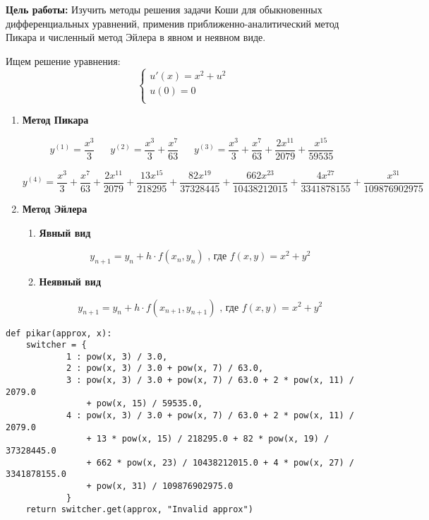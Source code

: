 \documentclass[a4paper,14pt]{article} %
\begin{document}
\textbf{Цель работы: } Изучить методы решения задачи Коши для обыкновенных дифференциальных уравнений, применив приближенно-аналитический метод Пикара и численный метод Эйлера в явном и неявном виде. 

Ищем решение уравнения:
$$
\left\{
  \begin{array}{ccc}
     u'(x)=x^2+u^2 \\
     u(0)=0 \\
  \end{array}
\right.
$$

\begin{enumerate}
\item \textbf{Метод Пикара}

$$y^{(1)}=\frac{x^3}{3}
~~~~~~~y^{(2)}=\frac{x^3}{3} + \frac{x^7}{63}
~~~~~~~y^{(3)}=\frac{x^3}{3}+ \frac{x^7}{63} + \frac{2x^{11}}{2079} + \frac{x^{15}}{59535}$$

$$y^{(4)}=\frac{x^3}{3}+ \frac{x^7}{63} + \frac{2x^{11}}{2079} + \frac{13x^{15}}{218295} + \frac{82x^{19}}{37328445} +  \frac{662x^{23}}{10438212015}+\frac{4x^{27}}{3341878155}+\frac{x^{31}}{109876902975}$$

\item \textbf{Метод Эйлера}
\begin{enumerate}
\item \textbf{Явный вид}

$$y_{n+1}=y_n+h\cdot f(x_n,y_n)\text{ , где }f(x,y)=x^2+y^2$$

\item \textbf{Неявный вид}

$$y_{n+1}=y_n+h\cdot f(x_{n+1},y_{n+1})\text{ , где }f(x,y)=x^2+y^2$$

\end{enumerate}
\end{enumerate}

 
\begin{lstlisting}[caption=Метод Пикара]
def pikar(approx, x):
    switcher = {
            1 : pow(x, 3) / 3.0,
            2 : pow(x, 3) / 3.0 + pow(x, 7) / 63.0,
            3 : pow(x, 3) / 3.0 + pow(x, 7) / 63.0 + 2 * pow(x, 11) / 2079.0
                + pow(x, 15) / 59535.0,
            4 : pow(x, 3) / 3.0 + pow(x, 7) / 63.0 + 2 * pow(x, 11) / 2079.0
                + 13 * pow(x, 15) / 218295.0 + 82 * pow(x, 19) / 37328445.0
                + 662 * pow(x, 23) / 10438212015.0 + 4 * pow(x, 27) / 3341878155.0
                + pow(x, 31) / 109876902975.0
            }
    return switcher.get(approx, "Invalid approx")
\end{lstlisting}
        
\end{document}
